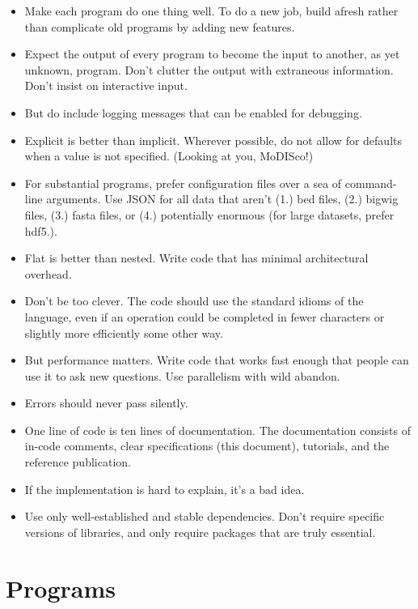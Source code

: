 \documentclass{article}
\begin{document}
\begin{itemize}
    \item Make each program do one thing well.
        To do a new job, build afresh rather than complicate old programs by
        adding new features.
    \item Expect the output of every program to become the input to another,
        as yet unknown, program.
        Don't clutter the output with extraneous information.
        Don't insist on interactive input.
    \item But do include logging messages that can be enabled for debugging.
    \item Explicit is better than implicit.
        Wherever possible, do not allow for defaults when a value is not
        specified.
        (Looking at you, MoDISco!)
    \item For substantial programs, prefer configuration files over a sea of
        command-line arguments.
        Use JSON for all data that aren't (1.) bed files, (2.) bigwig files,
        (3.) fasta files, or (4.) potentially enormous
        (for large datasets, prefer hdf5.).
    \item Flat is better than nested.
        Write code that has minimal architectural overhead.
    \item Don't be too clever.
        The code should use the standard idioms of the language, even if an
        operation could be completed in fewer characters or slightly more
        efficiently some other way.
    \item But performance matters.
        Write code that works fast enough that people can use it to ask new
        questions.
        Use parallelism with wild abandon.
    \item Errors should never pass silently.
    \item One line of code is ten lines of documentation.
        The documentation consists of in-code comments, clear specifications
        (this document), tutorials, and the reference publication.
    \item If the implementation is hard to explain, it's a bad idea.
    \item Use only well-established and stable dependencies.
        Don't require specific versions of libraries, and only require packages
        that are truly essential.
\end{itemize}

\newpage

\section{Programs}
\end{document}
